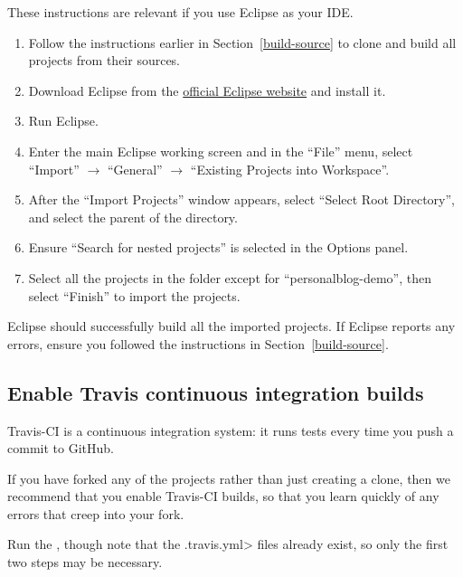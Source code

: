 These instructions are relevant if you use Eclipse as your IDE\@.

\begin{enumerate}
\item Follow the instructions earlier in Section~\ref{build-source} to
clone and build all projects from their sources.
\item Download Eclipse from
the \href{https://www.eclipse.org/downloads/}{official Eclipse website}
and install it.
\item Run Eclipse.
\item Enter the main Eclipse working screen and in the ``File'' menu,
select ``Import'' $\rightarrow$ ``General'' $\rightarrow$ ``Existing
Projects into Workspace''.
\item After the ``Import Projects'' window appears, select ``Select
Root Directory'', and select the parent of the  directory.
\item Ensure ``Search for nested projects'' is selected in the Options panel.
\item Select all the projects in the folder except for ``personalblog-demo'',
then select ``Finish'' to import the projects.
\end{enumerate}
Eclipse should successfully build all the imported projects.
If Eclipse reports any errors, ensure you followed the instructions
in Section~\ref{build-source}.


\subsection{Enable Travis continuous integration builds\label{building-travis}}

Travis-CI is a continuous integration system:  it runs tests every time you
push a commit to GitHub.

If you have forked any of the projects rather than just creating a clone,
then we recommend that you enable Travis-CI builds,
so that you learn quickly of any errors that creep into your fork.

Run the
,
though note that the \<.travis.yml> files already exist, so only the first
two steps may be necessary.

